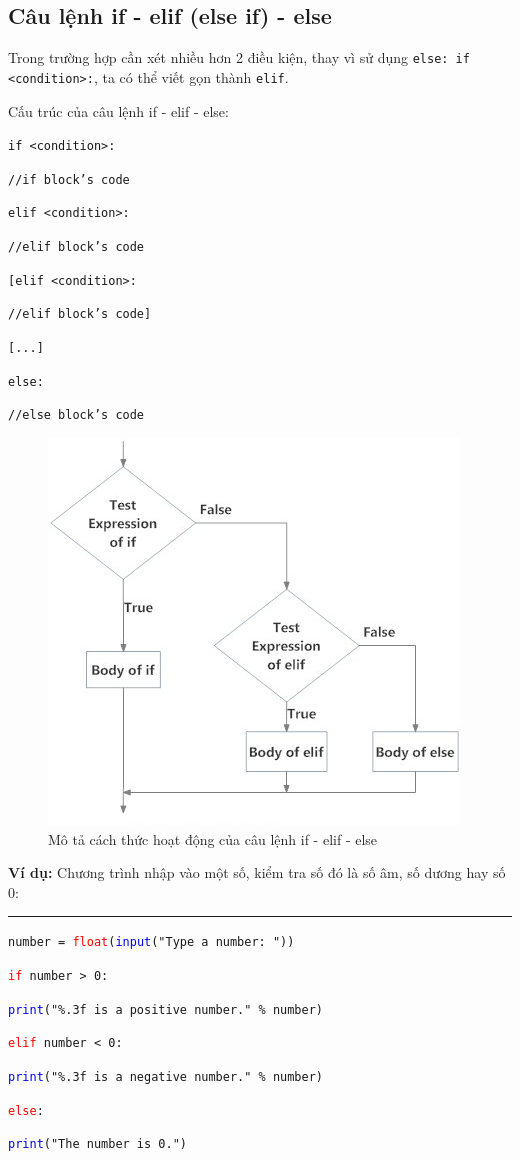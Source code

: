 \subsection{Câu lệnh if - elif (else if) - else}
Trong trường hợp cần xét nhiều hơn 2 điều kiện, thay vì sử dụng \texttt{else: if <condition>:}, ta có thể viết gọn thành \texttt{elif}.\par
Cấu trúc của câu lệnh if - elif - else:\par
\texttt{if <condition>:}\par
\qquad \texttt{//if block's code}\par
\texttt{elif <condition>:}\par
\qquad \texttt{//elif block's code}\par
\texttt{[elif <condition>:}\par
\qquad \texttt{//elif block's code]}\par
\texttt{[...]}\par
\texttt{else:}\par
\qquad \texttt{//else block's code}\par
\begin{figure}[h]
	\centering
	\includegraphics{img/if_elif}
	\caption{Mô tả cách thức hoạt động của câu lệnh if - elif - else}
\end{figure}
\newpage
\textbf{Ví dụ:} Chương trình nhập vào một số, kiểm tra số đó là số âm, số dương hay số 0:\\
\rule{\linewidth}{0.2mm}\par
\begin{linenumbers}
	\texttt{number = \textcolor{red}{float}(\textcolor{blue}{input}("Type a number: "))}\par
	\texttt{\textcolor{red}{if} number > 0:}\par
	\qquad \texttt{\textcolor{blue}{print}("\%.3f is a positive number." \% number)}\par
	\texttt{\textcolor{red}{elif} number < 0:}\par
	\qquad \texttt{\textcolor{blue}{print}("\%.3f is a negative number." \% number)}\par
	\texttt{\textcolor{red}{else}:}\par
	\qquad \texttt{\textcolor{blue}{print}("The number is 0.")}\par
\end{linenumbers}
